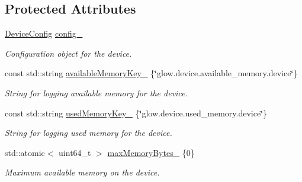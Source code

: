 \subsection*{Protected Attributes}
\begin{DoxyCompactItemize}
\item 
\mbox{\label{classglow_1_1runtime_1_1_device_manager_a77fc2be49d409dd7228f9c83525ba651}} 
\hyperlink{structglow_1_1runtime_1_1_device_config}{Device\+Config} \hyperlink{classglow_1_1runtime_1_1_device_manager_a77fc2be49d409dd7228f9c83525ba651}{config\+\_\+}
\begin{DoxyCompactList}\small\item\em Configuration object for the device. \end{DoxyCompactList}\item 
\mbox{\label{classglow_1_1runtime_1_1_device_manager_a9f09dfe989c0ddb00809ed12888e527c}} 
const std\+::string \hyperlink{classglow_1_1runtime_1_1_device_manager_a9f09dfe989c0ddb00809ed12888e527c}{available\+Memory\+Key\+\_\+} \{\char`\"{}glow.\+device.\+available\+\_\+memory.\+device\char`\"{}\}
\begin{DoxyCompactList}\small\item\em String for logging available memory for the device. \end{DoxyCompactList}\item 
\mbox{\label{classglow_1_1runtime_1_1_device_manager_aa267c5e28fdeeb4fe59ad94bdf71e5fa}} 
const std\+::string \hyperlink{classglow_1_1runtime_1_1_device_manager_aa267c5e28fdeeb4fe59ad94bdf71e5fa}{used\+Memory\+Key\+\_\+} \{\char`\"{}glow.\+device.\+used\+\_\+memory.\+device\char`\"{}\}
\begin{DoxyCompactList}\small\item\em String for logging used memory for the device. \end{DoxyCompactList}\item 
\mbox{\label{classglow_1_1runtime_1_1_device_manager_af95be4fe47e7cf4f5f8061d573eef9b5}} 
std\+::atomic$<$ uint64\+\_\+t $>$ \hyperlink{classglow_1_1runtime_1_1_device_manager_af95be4fe47e7cf4f5f8061d573eef9b5}{max\+Memory\+Bytes\+\_\+} \{0\}
\begin{DoxyCompactList}\small\item\em Maximum available memory on the device. \end{DoxyCompactList}\item 

\end{DoxyCompactItemize}
